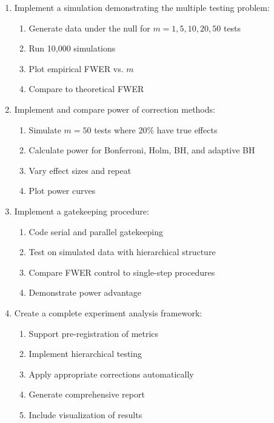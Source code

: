 \begin{enumerate}
    \item Implement a simulation demonstrating the multiple testing problem:
    \begin{enumerate}
        \item Generate data under the null for $m = 1, 5, 10, 20, 50$ tests
        \item Run 10,000 simulations
        \item Plot empirical FWER vs. $m$
        \item Compare to theoretical FWER
    \end{enumerate}

    \item Implement and compare power of correction methods:
    \begin{enumerate}
        \item Simulate $m = 50$ tests where 20\% have true effects
        \item Calculate power for Bonferroni, Holm, BH, and adaptive BH
        \item Vary effect sizes and repeat
        \item Plot power curves
    \end{enumerate}

    \item Implement a gatekeeping procedure:
    \begin{enumerate}
        \item Code serial and parallel gatekeeping
        \item Test on simulated data with hierarchical structure
        \item Compare FWER control to single-step procedures
        \item Demonstrate power advantage
    \end{enumerate}

    \item Create a complete experiment analysis framework:
    \begin{enumerate}
        \item Support pre-registration of metrics
        \item Implement hierarchical testing
        \item Apply appropriate corrections automatically
        \item Generate comprehensive report
        \item Include visualization of results
    \end{enumerate}
\end{enumerate}

